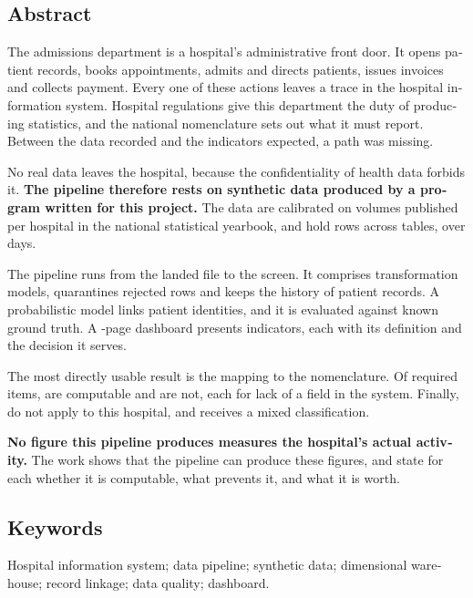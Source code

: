 \begin{otherlanguage}{english}
\chapter*{Abstract}

The admissions department is a hospital's administrative front door. It opens patient records,
books appointments, admits and directs patients, issues invoices and collects payment. Every one of
these actions leaves a trace in the hospital information system. Hospital regulations give this
department the duty of producing statistics, and the national nomenclature sets out what it must
report. Between the data recorded and the indicators expected, a path was missing.

No real data leaves the hospital, because the confidentiality of health data forbids it.
\textbf{The pipeline therefore rests on synthetic data produced by a program written for this
project.} The data are calibrated on volumes published per hospital in the national statistical
yearbook, and hold  rows across  tables, over
 days.

The pipeline runs from the landed file to the screen. It comprises 
transformation models, quarantines rejected rows and keeps the history of patient records. A
probabilistic model links patient identities, and it is evaluated against known ground truth. A
-page dashboard presents  indicators, each with its
definition and the decision it serves.

The most directly usable result is the mapping to the nomenclature. Of
 required items,  are computable and
 are not, each for lack of a field in the system. Finally,
 do not apply to this hospital, and
 receives a mixed classification.

\textbf{No figure this pipeline produces measures the hospital's actual activity.} The work shows
that the pipeline can produce these figures, and state for each whether it is computable, what
prevents it, and what it is worth.

\section*{Keywords}

Hospital information system; data pipeline; synthetic data; dimensional warehouse; record linkage;
data quality; dashboard.
\end{otherlanguage}
